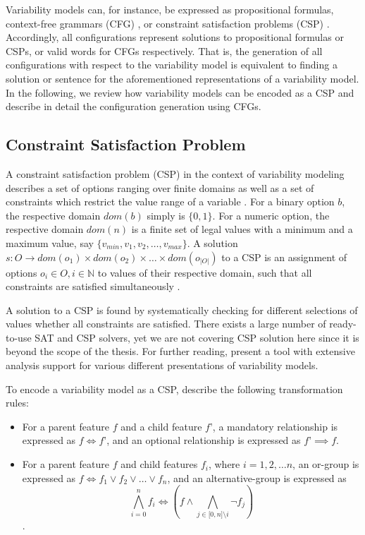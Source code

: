 Variability models can, for instance, be expressed as propositional formulas,
context-free grammars (CFG) \cite{batory_feature_2005}, or constraint satisfaction problems
(CSP) \cite{benavides_automated_2005,benavides_using_2005}. Accordingly, all configurations
represent solutions to propositional formulas or CSPs, or valid words for CFGs
respectively. That is, the generation of all configurations with respect to the
variability model is equivalent to finding a solution or sentence for the
aforementioned representations of a variability model. In the following, we
review how variability models can be encoded as a CSP and describe in detail
the configuration generation using CFGs.

\subsection{Constraint Satisfaction Problem}
A constraint satisfaction problem (CSP) in the context of variability modeling
describes a set of options ranging over finite domains as well as a set of
constraints which restrict the value range of a variable
\citep{benavides_automated_2005}. For a binary option $b$, the respective domain $dom(b)$ simply is $\lbrace 0, 1\rbrace$.
For a numeric option, the respective domain $dom(n)$ is a finite set of legal
values with a minimum and a maximum value, say $\lbrace v_{min}, v_1,
v_2, \ldots, v_{max}\rbrace$.
A solution $s: O \rightarrow dom(o_1) \times dom(o_2) \times \ldots \times
dom(o_{|O|})$ to a CSP is an assignment of options $o_i \in O, i \in \mathbb{N}$
to values of their respective domain, such that all constraints are satisfied simultaneously \citep{benavides_automated_2005}.  

A solution to a CSP is found by systematically checking for different
selections of values whether all constraints are satisfied. There exists a
large number of ready-to-use SAT and CSP solvers, yet we are not covering CSP
solution here since it is beyond the scope of the thesis. For further reading, 
\citep{benavides_fama:_2007} present a tool with extensive analysis support for
various different presentations of variability models.

To encode a variability model as a CSP, \cite{benavides_automated_2005} describe
the following transformation rules:

\begin{itemize}
  \item For a parent feature $f$ and a child feature $f’$, a mandatory
  relationship is expressed as $f \Leftrightarrow f’$, and an optional relationship is
  expressed as $f’ \implies f$.
    \item  For a parent feature $f$ and child features $f_i$, where $i = 1, 2,
    \ldots n$, an or-group is expressed as $f \Leftrightarrow f_1 \lor f_2 \lor
    \ldots \lor f_n$, and an alternative-group is expressed as $$\bigwedge_{i
    = 0}^n f_i \Leftrightarrow (f \land \bigwedge_{j \in \lbrack 0, n \rbrack
    \setminus i} \neg f_j) $$.
\end{itemize}

